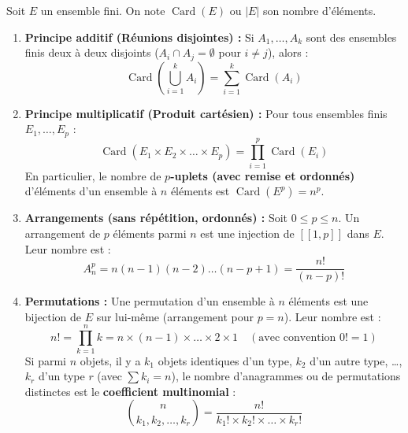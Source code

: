 \documentclass[11pt,a4paper]{article}
\begin{document}
\begin{coursbox}
Soit $E$ un ensemble fini. On note $\operatorname{Card}(E)$ ou $|E|$ son nombre d'éléments.
\begin{enumerate}
    \item \textbf{Principe additif (Réunions disjointes) :} Si $A_1, \dots, A_k$ sont des ensembles finis deux à deux disjoints ($A_i \cap A_j = \emptyset$ pour $i \neq j$), alors :
    \[
    \operatorname{Card}\left(\bigcup_{i=1}^k A_i\right) = \sum_{i=1}^k \operatorname{Card}(A_i)
    \]
    \item \textbf{Principe multiplicatif (Produit cartésien) :} Pour tous ensembles finis $E_1, \dots, E_p$ :
    \[
    \operatorname{Card}(E_1 \times E_2 \times \dots \times E_p) = \prod_{i=1}^p \operatorname{Card}(E_i)
    \]
    En particulier, le nombre de \textbf{$p$-uplets (avec remise et ordonnés)} d'éléments d'un ensemble à $n$ éléments est $\operatorname{Card}(E^p) = n^p$.

    \item \textbf{Arrangements (sans répétition, ordonnés) :} Soit $0 \le p \le n$. Un arrangement de $p$ éléments parmi $n$ est une injection de $[\![1, p]\!]$ dans $E$. Leur nombre est :
    \[
    A_n^p = n(n-1)(n-2)\dots(n-p+1) = \frac{n!}{(n-p)!}
    \]

    \item \textbf{Permutations :} Une permutation d'un ensemble à $n$ éléments est une bijection de $E$ sur lui-même (arrangement pour $p = n$). Leur nombre est :
    \[
    n! = \prod_{k=1}^n k = n \times (n-1) \times \dots \times 2 \times 1 \quad (\text{avec convention } 0! = 1)
    \]
    Si parmi $n$ objets, il y a $k_1$ objets identiques d'un type, $k_2$ d'un autre type, \dots, $k_r$ d'un type $r$ (avec $\sum k_i = n$), le nombre d'anagrammes ou de permutations distinctes est le \textbf{coefficient multinomial} :
    \[
    \binom{n}{k_1, k_2, \dots, k_r} = \frac{n!}{k_1! \times k_2! \times \dots \times k_r!}
    \]
\end{enumerate}
\end{coursbox}
\end{document}
